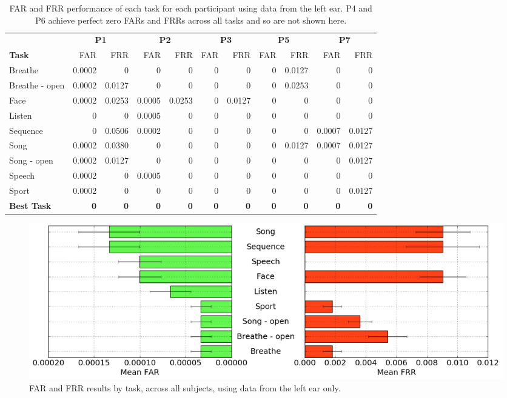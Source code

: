 \documentclass{sigchi-ext}
\begin{document}
\begin{table}
\centering
\begin{tabularx}{.85\textwidth}{lrrrrrrrrrr}
& \multicolumn{2}{c}{\textbf{P1}} & \multicolumn{2}{c}{\textbf{P2}} & \multicolumn{2}{c}{\textbf{P3}} & \multicolumn{2}{c}{\textbf{P5}} & \multicolumn{2}{c}{\textbf{P7}}\\
\textbf{Task} & FAR & FRR & FAR & FRR & FAR & FRR & FAR & FRR & FAR & FRR\\ \hline
Breathe & 0.0002 & 0 & 0 & 0 & 0 & 0 & 0 & 0.0127 & 0 & 0\\
Breathe - open & 0.0002 & 0.0127 & 0 & 0 & 0 & 0 & 0 & 0.0253 & 0 & 0\\
Face & 0.0002 & 0.0253 & 0.0005 & 0.0253 & 0 & 0.0127 & 0 & 0 & 0 & 0\\
Listen & 0 & 0 & 0.0005 & 0 & 0 & 0 & 0 & 0 & 0 & 0\\
Sequence & 0 & 0.0506 & 0.0002 & 0 & 0 & 0 & 0 & 0 & 0.0007 & 0.0127\\
Song   & 0.0002 & 0.0380 & 0 & 0 & 0 & 0 & 0 & 0.0127 & 0.0007 & 0.0127\\
Song - open & 0.0002 & 0.0127 & 0 & 0 & 0 & 0 & 0 & 0 & 0 & 0.0127\\
Speech & 0.0002 & 0 & 0.0005 & 0 & 0 & 0 & 0 & 0 & 0 & 0\\
Sport & 0.0002 & 0 & 0 & 0 & 0 & 0 & 0 & 0  & 0 & 0.0127\\ \hline
\textbf{Best Task} & \textbf{0} & \textbf{0} & \textbf{0} & \textbf{0} & \textbf{0} & \textbf{0} & \textbf{0} & \textbf{0} & \textbf{0} & \textbf{0}\\ \hline
\end{tabularx}
\caption{FAR and FRR performance of each task for each participant using data from the left ear. P4 and P6 achieve perfect zero FARs and FRRs across all tasks and so are not shown here.}
\label{tab:farfrrall}
\end{table}

\begin{figure}
\centering
\includegraphics[width=.9\linewidth]{./figures/mean-far-and-frr-by-task.png}
\caption{FAR and FRR results by task, across all subjects, using data from the left ear only.}
\label{fig:meanByTask}
\end{figure}
\end{document}
